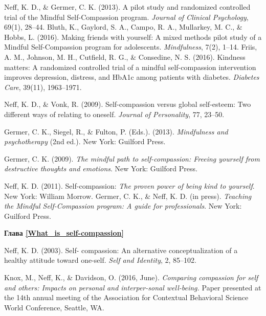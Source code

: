 \begin{thebibliography}{999}
	 Neff, K. D., \& Germer, C. K. (2013). A pilot study and randomized controlled trial of the Mindful Self-Compassion program. \textit{Journal of Clinical Psychology}, 69(1), 28–44.
	 Bluth, K., Gaylord, S. A., Campo, R. A., Mullarkey, M. C., \& Hobbs, L. (2016). Making friends with yourself: A mixed methods pilot study of a Mindful Self-Compassion program for adolescents. \textit{Mindfulness}, 7(2), 1–14.
	 Friis, A. M., Johnson, M. H., Cutfield, R. G., \& Consedine, N. S. (2016). Kindness matters: A randomized controlled trial of a mindful self-compassion intervention improves depression, distress, and HbA1c among patients with diabetes. \textit{Diabetes Care}, 39(11), 1963–1971.
	
	 Neff, K. D., \& Vonk, R. (2009). Self-compassion versus global self-esteem: Two different ways of relating to oneself. \textit{Journal of Personality}, 77, 23–50.
	
	 Germer, C. K., Siegel, R., \& Fulton, P. (Eds.). (2013). \textit{Mindfulness and psychotherapy} (2nd ed.). New York: Guilford Press.
	
	 Germer, C. K. (2009). \textit{The mindful path to self-compassion: Freeing yourself from destructive thoughts and emotions}. New York: Guilford Press.
	
	 Neff, K. D. (2011). Self-compassion: \textit{The proven power of being kind to yourself}. New York: William Morrow.
	 Germer, C. K., \& Neff, K. D. (in press). \textit{Teaching the Mindful Self-Compassion program: A guide for professionals}. New York: Guilford Press.
	
	\vspace{3ex}
	\textbf{Глава \ref{What_is_self-compassion}}
	
	 Neff, K. D. (2003). Self- compassion: An alternative conceptualization of a healthy attitude toward one-self. \textit{Self and Identity}, 2, 85–102.
	
	 Knox, M., Neff, K., \& Davidson, O. (2016, June). \textit{Comparing compassion for self and others: Impacts on personal and interper-sonal well-being.} Paper presented at the 14th annual meeting of the Association for Contextual Behavioral Science World Conference, Seattle, WA.
	
\end{thebibliography}
